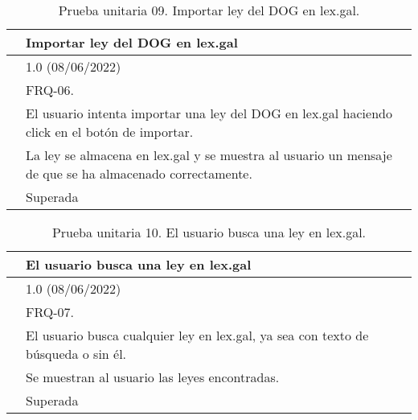 \begin{table}[H]
\begin{center}
\begin{tabular}{|p{3cm}|p{10cm}|} \hline
\centering {\bf PU-09} & Importar ley del DOG en lex.gal  \\ \hline\hline
\centering {\bf Versión} & 1.0 (08/06/2022) \\ \hline
\centering {\bf Dependencias} & FRQ-06. \\ \hline
\centering {\bf Descripción} &  El usuario intenta importar una ley del DOG en lex.gal haciendo click en el botón de importar. \\ \hline
\centering {\bf Criterio de aceptación} & La ley se almacena en lex.gal y se muestra al usuario un mensaje de que se ha almacenado correctamente. \\ \hline
\centering {\bf Estado} & Superada \\ \hline
\end{tabular}
\caption{Prueba unitaria 09. Importar ley del DOG en lex.gal.}
\label{enlacePU9}
\end{center}
\end{table}

\begin{table}[H]
\begin{center}
\begin{tabular}{|p{3cm}|p{10cm}|} \hline
\centering {\bf PU-10} & El usuario busca una ley en lex.gal  \\ \hline\hline
\centering {\bf Versión} & 1.0 (08/06/2022) \\ \hline
\centering {\bf Dependencias} & FRQ-07. \\ \hline
\centering {\bf Descripción} &  El usuario busca cualquier ley en lex.gal, ya sea con texto de búsqueda o sin él. \\ \hline
\centering {\bf Criterio de aceptación} & Se muestran al usuario las leyes encontradas. \\ \hline
\centering {\bf Estado} & Superada \\ \hline
\end{tabular}
\caption{Prueba unitaria 10. El usuario busca una ley en lex.gal.}
\label{enlacePU10}
\end{center}
\end{table}

